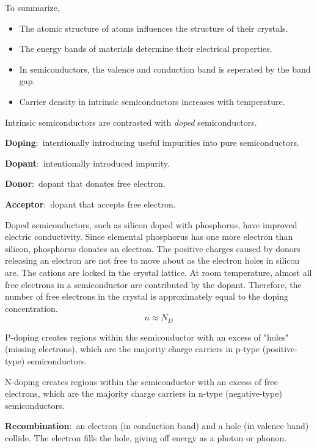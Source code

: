 \documentclass[nobib]{tufte-handout}
\newcommand{\defn}[2]{\noindent\textbf{#1}:\ #2}
\begin{document}
To summarize, 
\begin{itemize}
    \item The atomic structure of atoms influences the structure of their crystals. 
    \item The energy bands of materials determine their electrical properties. 
    \item In semiconductors, the valence and conduction band is seperated by the band gap. 
    \item Carrier density in intrinsic semiconductors increases with temperature. 
\end{itemize}

Intrinsic semiconductors are contrasted with \emph{doped} semiconductors. 

\defn{Doping}{intentionally
introducing useful impurities
into pure semiconductors}. 

\defn{Dopant}{intentionally introduced 
impurity}.

\defn{Donor}{dopant that donates free electron}. 

\defn{Acceptor}{dopant that accepts free electron}. 

Doped semiconductors, such as silicon doped with 
phosphorus, have improved electric conductivity. 
Since elemental phosphorus has one more electron than 
silicon, phosphorus donates an electron. 
The positive charges caused by donors releasing an electron 
are not free to move about as the electron holes in silicon are. 
The cations are locked in the crystal lattice. 
At room temperature, almost all free electrons in a semiconductor 
are contributed by the dopant. Therefore, the number of 
free electrons in the crystal is approximately equal to 
the doping concentration. 
\[n \approx N_D\]

P-doping creates regions within the semiconductor with an excess of 
"holes" (missing electrons), which are the majority charge 
carriers in p-type (positive-type) semiconductors.

N-doping creates regions 
within the semiconductor with an excess of free 
electrons, which are the majority charge carriers 
in n-type (negative-type) semiconductors.

\defn{Recombination}{an electron (in
conduction band) and a hole (in valence
band) collide. The electron fills the hole,
giving off energy as a photon or phonon}.
\end{document}
